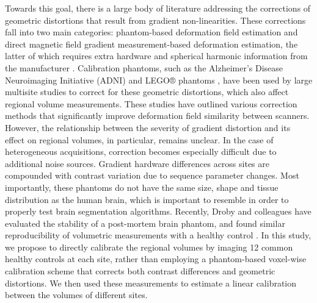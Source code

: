 Towards this goal, there is a large body of literature addressing the corrections of geometric distortions that result from gradient non-linearities. These corrections fall into two main categories: phantom-based deformation field estimation and direct magnetic field gradient measurement-based deformation estimation, the latter of which requires extra hardware and spherical harmonic information from the manufacturer \cite{fonov2010improved}. Calibration phantoms, such as the Alzheimer's Disease Neuroimaging Initiative (ADNI) \cite{gunter2009measurement} and LEGO® phantoms \cite{caramanos2010gradient}, have been used by large multisite studies to correct for these geometric distortions, which also affect regional volume measurements. These studies have outlined various correction methods that significantly improve deformation field similarity between scanners. However, the relationship between the severity of gradient distortion and its effect on regional volumes, in particular, remains unclear. In the case of heterogeneous acquisitions, correction becomes especially difficult due to additional noise sources. Gradient hardware differences across sites are compounded with contrast variation due to sequence parameter changes. Most importantly, these phantoms do not have the same size, shape and tissue distribution as the human brain, which is important to resemble in order to properly test brain segmentation algorithms. Recently, Droby and colleagues have evaluated the stability of a post-mortem brain phantom, and found similar reproducibility of volumetric measurements with a healthy control \cite{droby2015human}. In this study, we propose to directly calibrate the regional volumes by imaging 12 common healthy controls at each site, rather than employing a phantom-based voxel-wise calibration scheme that corrects both contrast differences and geometric distortions. We then used these measurements to estimate a linear calibration between the volumes of different sites.